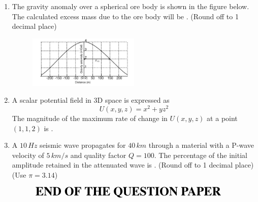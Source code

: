 \documentclass[journal,12pt,onecolumn]{IEEEtran}
\begin{document}
\begin{enumerate}
\hfill{}


\item The gravity anomaly over a spherical ore body is shown in the figure below. The calculated excess mass due to the ore body will be . (Round off to 1 decimal place) \\
\begin{figure}[h]
\centering
\includegraphics[width=0.5\textwidth]{figs/fig14.png}
\caption{}
\label{fig:q28}
\end{figure}

\hfill{}


\item A scalar potential field in 3D space is expressed as 
\[
U(x,y,z) = x^2 + yz^2
\]
The magnitude of the maximum rate of change in $U(x,y,z)$ at a point $(1,1,2)$ is \brak{\text{}}.

\hfill{}


\item A $10 \, Hz$ seismic wave propagates for $40 \, km$ through a material with a P-wave velocity of $5 \, km/s$ and quality factor $Q=100$. The percentage of the initial amplitude retained in the attenuated wave is \brak{\text{\%}}. (Round off to 1 decimal place) (Use $\pi = 3.14$)

\hfill{}







\end{enumerate}

\begin{align*}
 {\LARGE{\textbf{END OF THE QUESTION PAPER}}}
\end{align*}
\end{document}

